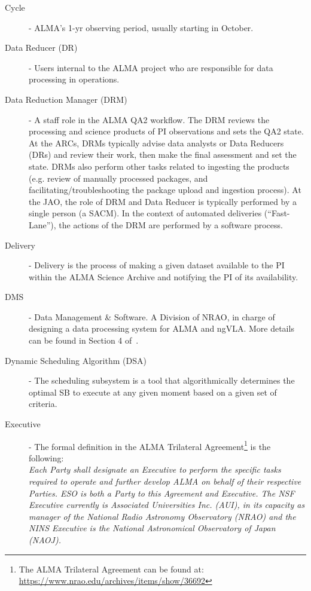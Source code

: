 \begin{description}
\item[Cycle] - ALMA's 1-yr observing period, usually starting in October. 
\item[Data Reducer (DR)] - Users internal to the ALMA project who are responsible for data processing in operations.
\item[Data Reduction Manager (DRM)] - A staff role in the ALMA QA2 workflow. The DRM reviews the processing and science products of PI observations and sets the QA2 state. At the ARCs, DRMs typically advise data analysts or Data Reducers (DRs) and review their work, then make the final assessment and set the state. DRMs also perform other tasks related to ingesting the products (e.g. review of manually processed packages, and facilitating/troubleshooting the package upload and ingestion process). At the JAO, the role of DRM and Data Reducer is typically performed by a single person (a SACM). In the context of automated deliveries (``Fast-Lane''), the actions of the DRM are performed by a software process.
\item[Delivery] - Delivery is the process of making a given dataset available to the PI within the ALMA Science Archive and notifying the PI of its availability.
\item[DMS] - Data Management \& Software. A Division of NRAO, in charge of designing a data processing system for ALMA and ngVLA. More details can be found in Section 4 of~\cite{dp}. 
\item[Dynamic Scheduling Algorithm (DSA)] - The scheduling subsystem is a tool that algorithmically determines the optimal SB to execute at any given moment based on a given set of criteria.
\item[Executive] - The formal definition in the ALMA Trilateral Agreement\footnote{The ALMA Trilateral Agreement can be found at: \url{https://www.nrao.edu/archives/items/show/36692}} is the following:\\
\textit{Each Party shall designate an Executive to perform the specific tasks required to operate and further develop ALMA on behalf of their respective Parties. ESO is both a Party to this Agreement and Executive. The NSF Executive currently is Associated Universities Inc. (AUI), in its capacity as manager of the National Radio Astronomy Observatory (NRAO) and the NINS Executive is the National Astronomical Observatory of Japan (NAOJ).}


\end{description}
